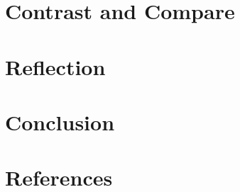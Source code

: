 \documentclass[12pt, letterpaper, twoside]{article}
\begin{document}
\section{Contrast and Compare}


\section{Reflection}

\section{Conclusion}

\section{References} 
 
\end{document}
